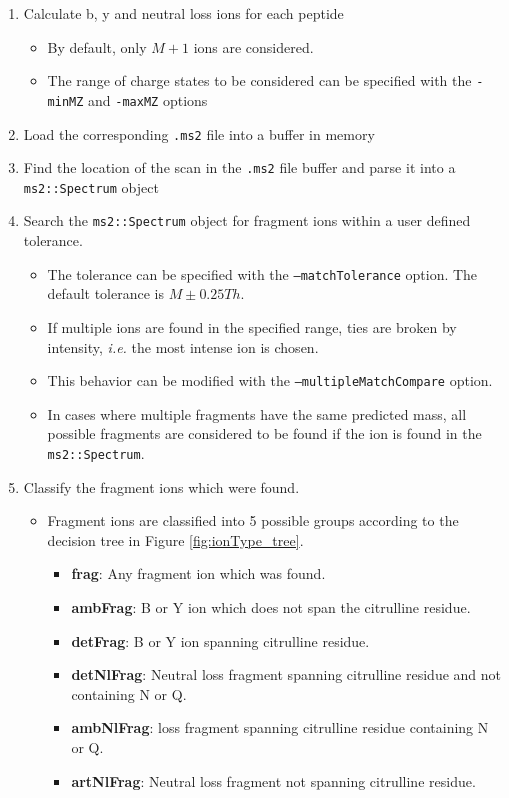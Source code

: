 \documentclass[12pt]{article}
\begin{document}
	\begin{enumerate}%
		\item Calculate b, y and neutral loss ions for each peptide
		\begin{itemize}
			\item By default, only $M+1$ ions are considered.
			\item The range of charge states to be considered can be specified with the \texttt{-minMZ} and \texttt{-maxMZ} options
		\end{itemize}
		
		\item Load the corresponding \texttt{.ms2} file into a buffer in memory
		
		\item Find the location of the scan in the \texttt{.ms2} file buffer and parse it into a \texttt{ms2::Spectrum} object

		\item Search the \texttt{ms2::Spectrum} object for fragment ions within a user defined tolerance.
		\begin{itemize}
			\item The tolerance can be specified with the \texttt{--matchTolerance} option.  The default tolerance is $M \pm 0.25 Th$. 
			\item If multiple ions are found in the specified range, ties are broken by intensity, \textit{i.e.} the most intense ion is chosen.
			\item This behavior can be modified with the \texttt{--multipleMatchCompare} option.
			\item In cases where multiple fragments have the same predicted mass, all possible fragments are considered to be found if the ion is found in the \texttt{ms2::Spectrum}.
		\end{itemize}

		\item Classify the fragment ions which were found.
		\begin{itemize}
			\item Fragment ions are classified into 5 possible groups according to the decision tree in Figure \ref{fig:ionType_tree}.

			\begin{itemize}
				\item \textbf{frag}: Any fragment ion which was found.
				\item \textbf{ambFrag}: B or Y ion which does not span the citrulline residue.
				\item \textbf{detFrag}: B or Y ion spanning citrulline residue.
				\item \textbf{detNlFrag}: Neutral loss fragment spanning citrulline residue and not containing N or Q.
				\item \textbf{ambNlFrag}: loss fragment spanning citrulline residue containing N or Q.
				\item \textbf{artNlFrag}: Neutral loss fragment not spanning citrulline residue.


\end{itemize}
\end{itemize}
\end{enumerate}
\end{document}
